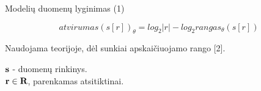 \begin{frame}[c]{Modelių duomenų lyginimas (1)}
 
 \begin{equation}
     atvirumas(s[r])_{\theta} = log_{2}|r| - log_{2} rangas_{\theta}(s[r])
 \end{equation}
 
Naudojama teorijoje, dėl sunkiai apskaičiuojamo rango [2].

$\bf s$ - duomenų rinkinys. \\
$\bf r \in R$, parenkamas atsitiktinai.

\end{frame}